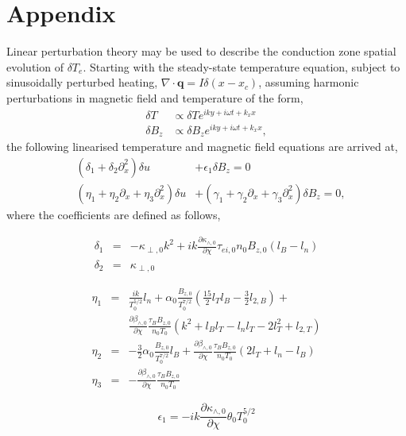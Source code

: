 \documentclass[aip,reprint]{revtex4-1}
\begin{document}
\section{Appendix}

\label{sec:eignmodes}
Linear perturbation theory may be used to describe the conduction zone spatial evolution of $\delta T_e$. Starting with the steady-state temperature equation, subject to sinusoidally perturbed heating, $\nabla \cdot \mathbf{q} = I\delta (x-x_c)$, assuming harmonic perturbations in magnetic field and temperature of the form,
\begin{eqnarray}
\delta T &\propto \delta T e^{iky + i \omega t + k_x x}\\
\delta B_z &\propto \delta B_z e^{iky + i \omega t + k_x x},
\end{eqnarray}
the following linearised temperature and magnetic field equations are arrived at,
\begin{eqnarray}
&(\delta_1 + \delta_2 \partial_x^2 )\delta u &+ \epsilon_1 \delta B_{z} = 0\\
&(\eta_1 + \eta_2 \partial_x + \eta_3 \partial^2_x)\delta u &+(\gamma_1 + \gamma_2 \partial_x + \gamma_3 \partial^2_x)\delta B_z= 0,
\end{eqnarray}
where the coefficients are defined as follows,

\begin{eqnarray}
\delta_1 &=& -\kappa_{\perp,0}k^2 + i k \frac{\partial \kappa_{\wedge,0}}{\partial \chi} \tau_{ei,0} n_0 B_{z,0}\left(l_B - l_n \right) \\
\delta_2 &=& \kappa_{\perp,0}
\end{eqnarray}

\begin{eqnarray}
\eta_1 &=& \frac{i k }{T_0^{5/2}} l_n +\alpha_0
\frac{ B_{z,0}}{T_0^{7/2}}\left(\frac{15}{2} l_T l_B - \frac{3}{2} l_{2,B}\right) + \nonumber\\
&&\frac{\partial \beta_{\wedge,0}}{\partial \chi}\frac{\tau_B B_{z,0}}{n_0 T_0}\left(k^2 + l_B l_T - l_n l_T - 2l_T^2 + l_{2,T} \right)\\
\eta_2 &=& - \frac{3}{2}\alpha_0\frac{B_{z,0}}{T_0^{7/2}}l_B + \frac{\partial \beta_{\wedge,0}}{\partial \chi}\frac{\tau_B B_{z,0}}{n_0 T_0} (2l_T + l_n - l_B) \\
\eta_3 &=& - \frac{\partial \beta_{\wedge,0}}{\partial \chi} \frac{\tau_B B_{z,0}}{n_0 T_0}
\end{eqnarray}

\begin{equation}
\epsilon_1 = -i k \frac{\partial \kappa_{\wedge,0}}{\partial \chi} \theta_0 T_0^{5/2} 
\end{equation}
\end{document}
